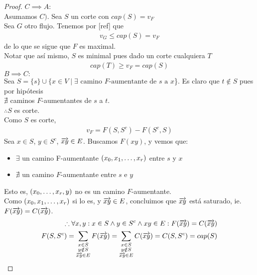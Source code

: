 \begin{proof}
  $C \implies A:$\\
  Asumamos $C)$. Sea $S$ un corte con $cap(S) = v_F$\\
  Sea $G$ otro flujo. Tenemos por [ref] que
  \begin{align} v_G \le cap(S) = v_F \end{align}
  de lo que se sigue que $F$ es maximal.\\
  
  Notar que así mismo, $S$ es minimal pues dado un corte cualquiera $T$\begin{align}
    cap(T) \ge v_F = cap(S)
  \end{align}
  $B \implies C:$\\
  Sea $S = \{s\} \cup \{x \in V \mid \exists \text{ camino $F$-aumentante de $s$ a $x$}$\}.
  Es claro que $t \notin S$ pues por hipótesis \\$\nexists$ caminos $F$-aumentantes de $s$ a $t$.\\
  $\therefore S$ es corte.\\
  Como $S$ es corte,
  \begin{align}
    v_F = F(S, S^c) - F(S^c, S)
  \end{align}
  Sea $x \in S$, $y \in S^c$, $\overrightarrow{xy} \in E$. Buscamos $F(xy)$, y vemos que:
  \begin{itemize}
  \item $\exists$ un camino F-aumentante $(x_0, x_1,\mathellipsis, x_r)$ entre $s$ y $x$
  \item $\nexists$ un camino $F$-aumentante entre $s$ e $y$
  \end{itemize}
  Esto es, $(x_0, \mathellipsis, x_r, y)$ no es un camino $F$-aumentante.\\
  Como $(x_0, x_1, \mathellipsis, x_r)$ si lo es, y $\overrightarrow{xy} \in E$, concluimos que $\overrightarrow{xy}$ está saturado, ie. \\$F(\overrightarrow{xy}) = C(\overrightarrow{xy})$.
  \begin{align}
    \therefore \forall x,y: x \in S \wedge y \in S^c \wedge xy \in E : F(\overrightarrow{xy}) = C(\overrightarrow{xy})\\
    F(S, S^c) = \sum_{\substack{x\in S\\ y \notin S \\\overrightarrow{xy} \in E}} F(\overrightarrow{xy}) = \sum_{\substack{x\in S\\ y \notin S\\ \overrightarrow{xy} \in E}} C(\overrightarrow{xy}) = C(S, S^c) = cap(S)\\
  \end{align}

\end{proof}
